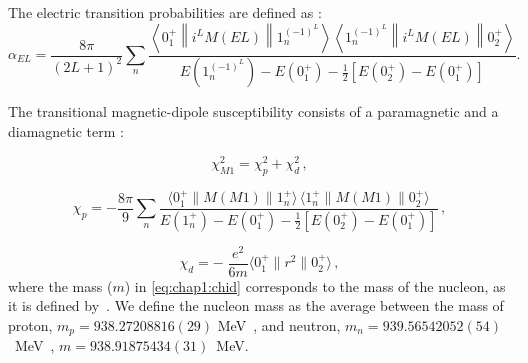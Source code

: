 
The electric transition probabilities are defined as \cite{Kramp-1987}:
\begin{equation}
    \alpha_{EL} = \frac{8\pi}{(2L + 1)^2}\sum_{n} \frac{\left\langle 0_1^+ \middle\| {i}^{L} M(EL) \middle\| 1_{n}^{{(-1)}^L} \right\rangle \left\langle 1_{n}^{{(-1)}^L} \middle\| {i}^{L} M(EL) \middle\| 0_2^+ \right\rangle}{E\left(1_{n}^{{(-1)}^L}\right)-E\left(0_1^+\right)-\frac{1}{2} 
    \left[E\left(0_2^+\right) - E\left(0_1^+\right)\right]}.
    \label{eq:chap1:alphaEL}
\end{equation}

The transitional magnetic-dipole susceptibility consists of a paramagnetic and a diamagnetic term \cite{Friar-1974,Friar-1975, Kramp-1987}:

\begin{equation}
   \chi_{M1}^2= \chi_{p}^2+\chi_{d}^2\,, 
 \label{eq:chap1:chim1}
\end{equation}

\begin{equation}
    \chi_{p}= -\frac{8\pi}{9}  
    \sum_n{
    \frac{\langle0_1^+\| M(M1) \| 1_n^+\rangle \, \langle 1_n^+\| M(M1) \|0_2^+ \rangle}
    {E\left(1_n^+\right)-E\left(0_1^+\right)-\frac{1}{2} 
    \left[E\left(0_2^+\right) - E\left(0_1^+\right)\right] }}\,,
    \label{eq:chap1:chip}
\end{equation}

\begin{equation}
    \chi_{d}= -\; \frac{e^2}{6m}
    \langle0_1^+\| r^2 \| 0_2^+\rangle\,,
    \label{eq:chap1:chid}
\end{equation}
where the mass ($m$) in \cref{eq:chap1:chid} corresponds to the mass of the nucleon, as it is defined by~\cite{Friar-1974}.
We define the nucleon mass as the average between the mass of proton, $m_p = 938.27208816(29)$ MeV~\cite{CODATA}, and neutron, $m_n = 939.56542052(54)$~MeV~\cite{CODATA}, $m = 938.91875434(31)$~MeV. 

